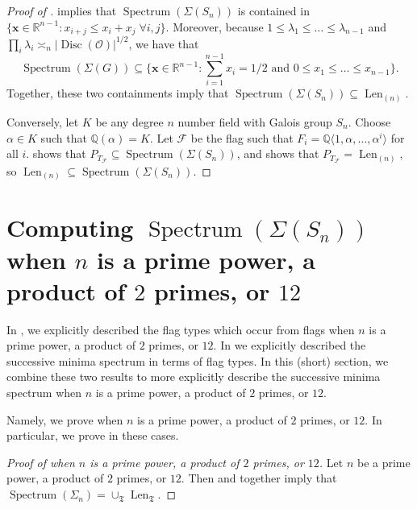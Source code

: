 \documentclass[letterpaper,10pt]{amsart}
\DeclareMathOperator{\Len}{Len}
\DeclareMathOperator{\Spe}{Spectrum}
\DeclareMathOperator{\Disc}{Disc}
\newcommand{\QQ}{\mathbb{Q}}      %
\newcommand{\RR}{\mathbb{R}}      %
\newcommand{\cO}{\mathcal{O}}      %
\newcommand{\mfT}{\mathfrak{T}}
\newcommand{\la}{\langle}
\newcommand{\ra}{\rangle}
\newcommand{\cF}{\mathcal{F}}
\theoremstyle{definition}
\theoremstyle{remark}
\begin{document}
\begin{proof}[Proof of ] 
 implies that $\Spe(\Sigma(S_n))$ is contained in $\{\mathbf{x} \in \RR^{n-1} : x_{i+j} \leq x_i + x_j \; \forall i,j\}$. Moreover, because $1 \leq \lambda_1 \leq \dots \leq \lambda_{n-1}$ and $\prod_i \lambda_i \asymp_n \lvert \Disc(\cO) \rvert^{1/2}$, we have that
\begin{equation*}
    \Spe(\Sigma(G)) \subseteq \{\mathbf{x} \in \RR^{n-1} : \sum_{i=1}^{n-1} x_i = 1/2 \text{ and } 0 \leq x_1 \leq \dots \leq x_{n-1}\}.
\end{equation*}
Together, these two containments imply that $\Spe(\Sigma(S_n)) \subseteq \Len_{(n)}$.

Conversely, let $K$ be any degree $n$ number field with Galois group $S_n$. Choose $\alpha \in K$ such that $\QQ(\alpha) = K$. Let $\cF$ be the flag such that $F_i = \QQ \la 1,\alpha,\dots,\alpha^i \ra$ for all $i$.  shows that $P_{T_{\cF}} \subseteq \Spe(\Sigma(S_n))$, and  shows that $P_{T_{\cF}} = \Len_{(n)}$, so $\Len_{(n)} \subseteq \Spe(\Sigma(S_n))$. 
\end{proof}

\section{Computing $\Spe(\Sigma(S_n))$ when $n$ is a prime power, a product of $2$ primes, or $12$}
\label{sec:lenstra-spectrum-good}

In , we explicitly described the flag types which occur from flags when $n$ is a prime power, a product of $2$ primes, or $12$. In  we explicitly described the successive minima spectrum in terms of flag types. In this (short) section, we combine these two results to more explicitly describe the successive minima spectrum when $n$ is a prime power, a product of $2$ primes, or $12$.

Namely, we prove  when $n$ is a prime power, a product of $2$ primes, or $12$. In particular, we prove  in these cases.

\begin{proof}[Proof of  when $n$ is a prime power, a product of $2$ primes, or $12$]
Let  $n$ be a prime power, a product of $2$ primes, or $12$. Then  and  together imply that $\Spe(\Sigma_n) = \cup_{\mfT} \Len_{\mfT}$.
\end{proof}
\end{document}
